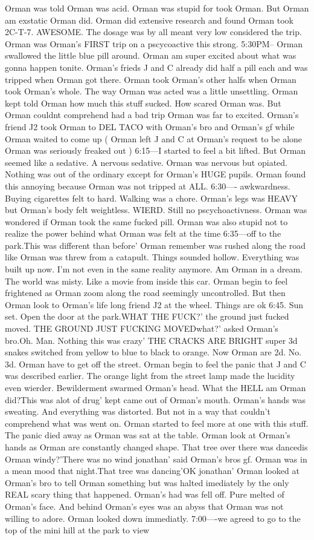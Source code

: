 \documentclass[12pt]{book}
\begin{document}
Orman was told Orman was acid. Orman was stupid for took Orman. But Orman am exstatic Orman did. Orman did extensive research and found Orman took 2C-T-7. AWESOME. The dosage was by all meant very low considered the trip. Orman was Orman's FIRST trip on a pscycoactive this strong. 5:30PM-- Orman swallowed the little blue pill around. Orman am super excited about what was gonna happen tonite. Orman's frieds J and C already did half a pill each and was tripped when Orman got there. Orman took Orman's other halfs when Orman took Orman's whole. The way Orman was acted was a little unsettling. Orman kept told Orman how much this stuff sucked. How scared Orman was. But Orman couldnt comprehend had a bad trip Orman was far to excited. Orman's friend J2 took Orman to DEL TACO with Orman's bro and Orman's gf while Orman waited to come up ( Orman left J and C at Orman's request to be alone Orman was seriously freaked out ) 6:15---I started to feel a bit lifted. But Orman seemed like a sedative. A nervous sedative. Orman was nervous but opiated. Nothing was out of the ordinary except for Orman's HUGE pupils. Orman found this annoying because Orman was not tripped at ALL. 6:30---- awkwardness. Buying cigarettes felt to hard. Walking was a chore. Orman's legs was HEAVY but Orman's body felt weightless. WIERD. Still no pscychoactivness. Orman was wondered if Orman took the same fucked pill. Orman was also stupid not to realize the power behind what Orman was felt at the time 6:35---off to the park.This was different than before' Orman remember was rushed along the road like Orman was threw from a catapult. Things sounded hollow. Everything was built up now. I'm not even in the same reality anymore. Am Orman in a dream. The world was misty. Like a movie from inside this car. Orman begin to feel frightened as Orman zoom along the road seemingly uncontrolled. But then Orman look to Orman's life long friend J2 at the wheel. Things are ok 6:45. Sun set. Open the door at the park.WHAT THE FUCK?' the ground just fucked moved. THE GROUND JUST FUCKING MOVEDwhat?' asked Orman's bro.Oh. Man. Nothing this was crazy' THE CRACKS ARE BRIGHT super 3d snakes switched from yellow to blue to black to orange. Now Orman are 2d. No. 3d. Orman have to get off the street. Orman begin to feel the panic that J and C was described earlier. The orange light from the street lamp made the lucidity even wierder. Bewilderment swarmed Orman's head. What the HELL am Orman did?This was alot of drug' kept came out of Orman's mouth. Orman's hands was sweating. And everything was distorted. But not in a way that couldn't comprehend what was went on. Orman started to feel more at one with this stuff. The panic died away as Orman was sat at the table. Orman look at Orman's hands as Orman are constantly changed shape. That tree over there was dancedis Orman windy?'There was no wind jonathan' said Orman's bros gf. Orman was in a mean mood that night.That tree was dancing'OK jonathan' Orman looked at Orman's bro to tell Orman something but was halted imediately by the only REAL scary thing that happened. Orman's had was fell off. Pure melted of Orman's face. And behind Orman's eyes was an abyss that Orman was not willing to adore. Orman looked down immediatly. 7:00----we agreed to go to the top of the mini hill at the park to view 
\end{document}
